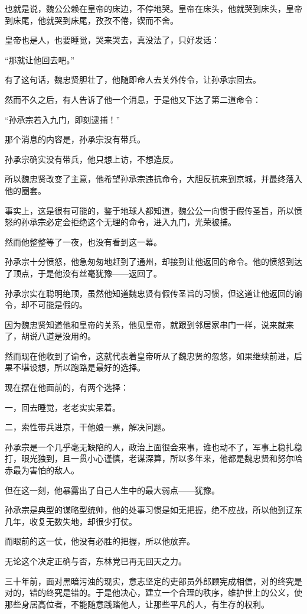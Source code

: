 \begin{multicols}{\theparacolNo}
		也就是说，魏公公赖在皇帝的床边，不停地哭。皇帝在床头，他就哭到床头，皇帝到床尾，他就哭到床尾，孜孜不倦，锲而不舍。

		皇帝也是人，也要睡觉，哭来哭去，真没法了，只好发话：

		“那就让他回去吧。”

		有了这句话，魏忠贤胆壮了，他随即命人去关外传令，让孙承宗回去。

		然而不久之后，有人告诉了他一个消息，于是他又下达了第二道命令：

		“孙承宗若入九门，即刻逮捕！”

		那个消息的内容是，孙承宗没有带兵。

		孙承宗确实没有带兵，他只想上访，不想造反。

		所以魏忠贤改变了主意，他希望孙承宗违抗命令，大胆反抗来到京城，并最终落入他的圈套。

		事实上，这是很有可能的，鉴于地球人都知道，魏公公一向惯于假传圣旨，所以愤怒的孙承宗必定会拒绝这个无理的命令，进入九门，光荣被捕。

		然而他整整等了一夜，也没有看到这一幕。

		孙承宗十分愤怒，他急匆匆地赶到了通州，却接到让他返回的命令。他的愤怒到达了顶点，于是他没有丝毫犹豫——返回了。

		孙承宗实在聪明绝顶，虽然他知道魏忠贤有假传圣旨的习惯，但这道让他返回的谕令，却不可能是假的。

		因为魏忠贤知道他和皇帝的关系，他见皇帝，就跟到邻居家串门一样，说来就来了，胡说八道是没用的。

		然而现在他收到了谕令，这就代表着皇帝听从了魏忠贤的忽悠，如果继续前进，后果不堪设想，所以跑路是最好的选择。

		现在摆在他面前的，有两个选择：

		一，回去睡觉，老老实实呆着。

		二，索性带兵进京，干他娘一票，解决问题。

		孙承宗是一个几乎毫无缺陷的人，政治上面很会来事，谁也动不了，军事上稳扎稳打，眼光独到，且一贯小心谨慎，老谋深算，所以多年来，他都是魏忠贤和努尔哈赤最为害怕的敌人。

		但在这一刻，他暴露出了自己人生中的最大弱点——犹豫。

		孙承宗是典型的谋略型统帅，他的处事习惯是如无把握，绝不应战，所以他到辽东几年，收复无数失地，却很少打仗。

		而眼前的这一仗，他没有必胜的把握，所以他放弃。

		无论这个决定正确与否，东林党已再无回天之力。

		三十年前，面对黑暗污浊的现实，意志坚定的吏部员外郎顾宪成相信，对的终究是对的，错的终究是错的。于是他决心，建立一个合理的秩序，维护世上的公义，使那些身居高位者，不能随意践踏他人，让那些平凡的人，有生存的权利。


\end{multicols}

